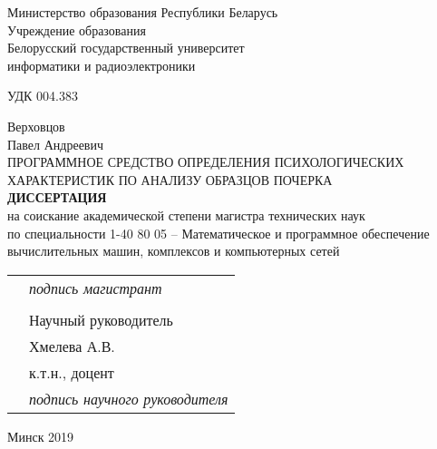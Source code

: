 \begin{titlepage}
  \begin{center}
    Министерство образования Республики Беларусь\\
    Учреждение образования\\
    Белорусский государственный университет \\
    информатики и радиоэлектроники\\[1em]

    \begin{flushleft}
        УДК 004.383
    \end{flushleft}
    Верховцов \\
    Павел Андреевич \\[1em]

    ПРОГРАММНОЕ СРЕДСТВО ОПРЕДЕЛЕНИЯ ПСИХОЛОГИЧЕСКИХ ХАРАКТЕРИСТИК ПО АНАЛИЗУ ОБРАЗЦОВ ПОЧЕРКА\\[1em]

    \textbf{ДИССЕРТАЦИЯ}\\
    {на соискание академической степени магистра технических наук}\\[2em]
    
    {по специальности 1-40 80 05 – Математическое и программное обеспечение вычислительных  машин, комплексов и компьютерных сетей}\\[2em]

    \begin{tabular}{ p{}p{} }
      & \emph{подпись магистрант} \\[1em] \\
      & Научный руководитель \\
      & Хмелева А.В.\\
      & к.т.н., доцент \\[1em]
      & \emph{подпись научного руководителя}
    \end{tabular}

    \vfill
    {\normalsize Минск 2019}
  \end{center}
\end{titlepage}

